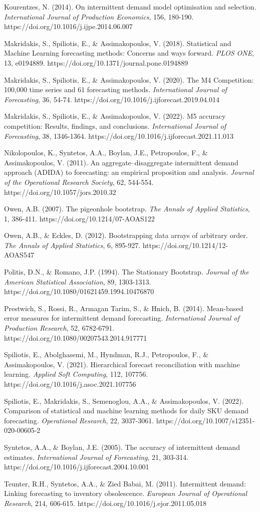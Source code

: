 \documentclass[
]{article}
\begin{document}
Kourentzes, N. (2014). On intermittent demand model optimisation and
selection. \emph{International Journal of Production Economics}, 156,
180-190. https://doi.org/10.1016/j.ijpe.2014.06.007

Makridakis, S., Spiliotis, E., \& Assimakopoulos, V. (2018). Statistical
and Machine Learning forecasting methods: Concerns and ways forward.
\emph{PLOS ONE}, 13, e0194889.
https://doi.org/10.1371/journal.pone.0194889

Makridakis, S., Spiliotis, E., \& Assimakopoulos, V. (2020). The M4
Competition: 100,000 time series and 61 forecasting methods.
\emph{International Journal of Forecasting}, 36, 54-74.
https://doi.org/10.1016/j.ijforecast.2019.04.014

Makridakis, S., Spiliotis, E., \& Assimakopoulos, V. (2022). M5 accuracy
competition: Results, findings, and conclusions. \emph{International
Journal of Forecasting}, 38, 1346-1364.
https://doi.org/10.1016/j.ijforecast.2021.11.013

Nikolopoulos, K., Syntetos, A.A., Boylan, J.E., Petropoulos, F., \&
Assimakopoulos, V. (2011). An aggregate--disaggregate intermittent
demand approach (ADIDA) to forecasting: an empirical proposition and
analysis. \emph{Journal of the Operational Research Society}, 62,
544-554. https://doi.org/10.1057/jors.2010.32

Owen, A.B. (2007). The pigeonhole bootstrap. \emph{The Annals of Applied
Statistics}, 1, 386-411. https://doi.org/10.1214/07-AOAS122

Owen, A.B., \& Eckles, D. (2012). Bootstrapping data arrays of arbitrary
order. \emph{The Annals of Applied Statistics}, 6, 895-927.
https://doi.org/10.1214/12-AOAS547

Politis, D.N., \& Romano, J.P. (1994). The Stationary Bootstrap.
\emph{Journal of the American Statistical Association}, 89, 1303-1313.
https://doi.org/10.1080/01621459.1994.10476870

Prestwich, S., Rossi, R., Armagan Tarim, S., \& Hnich, B. (2014).
Mean-based error measures for intermittent demand forecasting.
\emph{International Journal of Production Research}, 52, 6782-6791.
https://doi.org/10.1080/00207543.2014.917771

Spiliotis, E., Abolghasemi, M., Hyndman, R.J., Petropoulos, F., \&
Assimakopoulos, V. (2021). Hierarchical forecast reconciliation with
machine learning. \emph{Applied Soft Computing}, 112, 107756.
https://doi.org/10.1016/j.asoc.2021.107756

Spiliotis, E., Makridakis, S., Semenoglou, A.A., \& Assimakopoulos, V.
(2022). Comparison of statistical and machine learning methods for daily
SKU demand forecasting. \emph{Operational Research}, 22, 3037-3061.
https://doi.org/10.1007/s12351-020-00605-2

Syntetos, A.A., \& Boylan, J.E. (2005). The accuracy of intermittent
demand estimates. \emph{International Journal of Forecasting}, 21,
303-314. https://doi.org/10.1016/j.ijforecast.2004.10.001

Teunter, R.H., Syntetos, A.A., \& Zied Babai, M. (2011). Intermittent
demand: Linking forecasting to inventory obsolescence. \emph{European
Journal of Operational Research}, 214, 606-615.
https://doi.org/10.1016/j.ejor.2011.05.018
\end{document}
